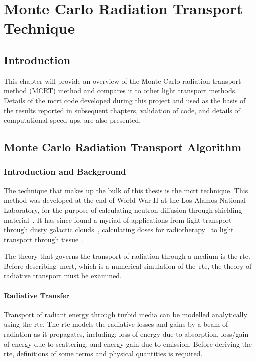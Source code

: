 \chapter{Monte Carlo Radiation Transport Technique}
\label{sec:mcrt}
\section{Introduction}
This chapter will provide an overview of the Monte Carlo radiation transport method (MCRT) method and compares it to other light transport methods. 
Details of the \gls*{mcrt} code developed during this project and used as the basis of the results reported in subsequent chapters, validation of code, and details of computational speed ups, are also presented.

\section{Monte Carlo Radiation Transport Algorithm}

\subsection{Introduction and Background}
The technique that makes up the bulk of this thesis is the \gls*{mcrt} technique. This method was developed at the end of World War II at the Los Alamos National Laboratory, for the purpose of calculating neutron diffusion through shielding material~\cite{montybeg1,eckhardt1987stan,anderson1986metropolis,ulam1947statistical}. It has since found a myriad of applications from light transport through dusty galactic clouds~\cite{wood1999model}, calculating doses for radiotherapy~\cite{rogers1995beam} to light transport through tissue~\cite{1stmonty}.

The theory that governs the transport of radiation through a medium is the \gls*{rte}.
Before describing~\gls*{mcrt}, which is a numerical simulation of the~\gls*{rte}, the theory of radiative transport must be examined.

\subsubsection*{Radiative Transfer}
Transport of radiant energy through turbid media can be modelled analytically using the \gls*{rte}. The \gls*{rte} models the radiative losses and gains by a beam of radiation as it propagates, including: loss of energy due to absorption, loss/gain of energy due to scattering, and energy gain due to emission. Before deriving the \gls*{rte}, definitions of some terms and physical quantities is required.


